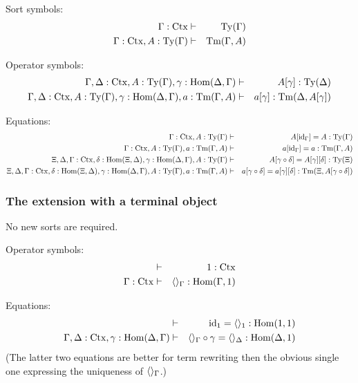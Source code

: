 \documentclass{lmcs}
\def\Ctx{\mathrm{Ctx}}
\def\Hom{\mathrm{Hom}}
\def\id{\mathrm{id}}
\begin{document}
Sort symbols:
\begin{eqnarray*}
\Gamma : \Ctx &\vdash& \Ty(\Gamma)\\
\Gamma : \Ctx, A:\Ty(\Gamma) &\vdash& \Tm(\Gamma,A)
\end{eqnarray*}

Operator symbols:
\begin{eqnarray*}
\Gamma,\Delta : \Ctx, A:\Ty(\Gamma), \gamma : \Hom(\Delta,\Gamma) &\vdash& 
A[\gamma] : \Ty(\Delta)\\
\Gamma,\Delta : \Ctx, A:\Ty(\Gamma), \gamma : \Hom(\Delta,\Gamma), a:\Tm(\Gamma,A) &\vdash&  a[\gamma] : \Tm(\Delta,A[\gamma])
\end{eqnarray*}



Equations:
\begin{eqnarray*}
\Gamma : \Ctx, A:\Ty(\Gamma) &\vdash& A[\id_\Gamma] = A : \Ty(\Gamma)\\
\Gamma : \Ctx, A:\Ty(\Gamma), a:\Tm(\Gamma,A) &\vdash& a[\id_\Gamma] = a : \Tm(\Gamma,A)\\
\Xi,\Delta,\Gamma : \Ctx, \delta : \Hom(\Xi,\Delta), \gamma : \Hom(\Delta,\Gamma),
A:\Ty(\Gamma) &\vdash& A[\gamma\circ\delta] = A[\gamma][\delta]: \Ty(\Xi)\\
\Xi,\Delta,\Gamma : \Ctx, \delta : \Hom(\Xi,\Delta), \gamma : \Hom(\Delta,\Gamma),
A:\Ty(\Gamma), a:\Tm(\Gamma,A) &\vdash& 
a[\gamma\circ\delta] = a[\gamma][\delta]: \Tm(\Xi,A[\gamma\circ\delta])
\end{eqnarray*}

\subsubsection{The extension with a terminal object}
No new sorts are required.
  
Operator symbols:
\begin{eqnarray*}
&\vdash& 1 : \Ctx\\
\Gamma : \Ctx &\vdash& \tuple{}_\Gamma : \Hom(\Gamma,1)
\end{eqnarray*}

Equations:
\begin{eqnarray*}
 &\vdash& \id_1 = \tuple{}_1 : \Hom(1,1)\\
\Gamma,\Delta : \Ctx, \gamma : \Hom(\Delta,\Gamma) &\vdash& 
\tuple{}_\Gamma\circ\gamma = \tuple{}_\Delta : \Hom(\Delta,1)
\end{eqnarray*}
(The latter two equations are better for term rewriting then the
obvious single one expressing the uniqueness of $\langle  \rangle_\Gamma$.)
\end{document}
